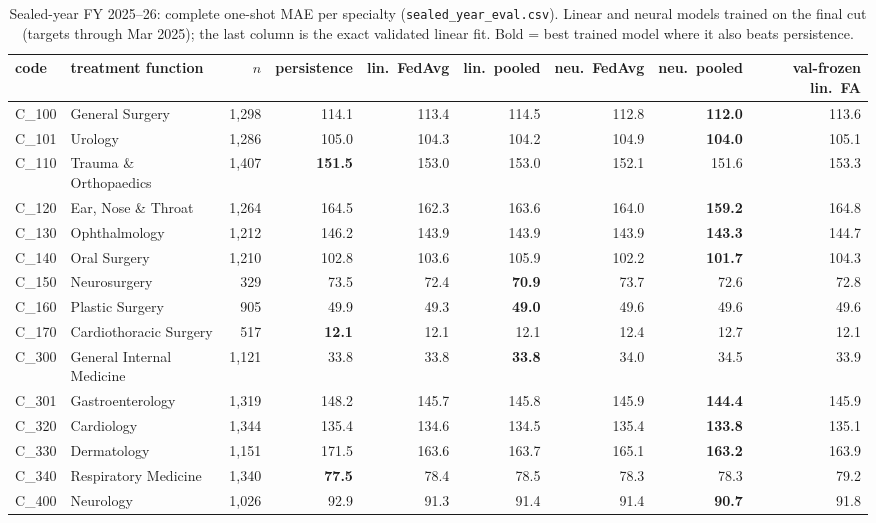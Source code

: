 \documentclass[conference]{IEEEtran}
\begin{document}
\begin{table}[t]
\caption{Sealed-year FY 2025--26: complete one-shot MAE per specialty
(\texttt{sealed\_year\_eval.csv}). Linear and neural models trained on the final cut (targets
through Mar 2025); the last column is the exact validated linear fit. Bold = best trained model
where it also beats persistence.}
\label{tab:sealedfull}
\centering
\scriptsize
\setlength{\tabcolsep}{3.5pt}
\begin{tabular}{llrrrrrrr}
\toprule
code & treatment function & $n$ & persistence & lin.\ FedAvg & lin.\ pooled & neu.\ FedAvg & neu.\ pooled & val-frozen lin.\ FA \\
\midrule
C\_100 & General Surgery & 1{,}298 & 114.1 & 113.4 & 114.5 & 112.8 & \textbf{112.0} & 113.6 \\
C\_101 & Urology & 1{,}286 & 105.0 & 104.3 & 104.2 & 104.9 & \textbf{104.0} & 105.1 \\
C\_110 & Trauma \& Orthopaedics & 1{,}407 & \textbf{151.5} & 153.0 & 153.0 & 152.1 & 151.6 & 153.3 \\
C\_120 & Ear, Nose \& Throat & 1{,}264 & 164.5 & 162.3 & 163.6 & 164.0 & \textbf{159.2} & 164.8 \\
C\_130 & Ophthalmology & 1{,}212 & 146.2 & 143.9 & 143.9 & 143.9 & \textbf{143.3} & 144.7 \\
C\_140 & Oral Surgery & 1{,}210 & 102.8 & 103.6 & 105.9 & 102.2 & \textbf{101.7} & 104.3 \\
C\_150 & Neurosurgery & 329 & 73.5 & 72.4 & \textbf{70.9} & 73.7 & 72.6 & 72.8 \\
C\_160 & Plastic Surgery & 905 & 49.9 & 49.3 & \textbf{49.0} & 49.6 & 49.6 & 49.6 \\
C\_170 & Cardiothoracic Surgery & 517 & \textbf{12.1} & 12.1 & 12.1 & 12.4 & 12.7 & 12.1 \\
C\_300 & General Internal Medicine & 1{,}121 & 33.8 & 33.8 & \textbf{33.8} & 34.0 & 34.5 & 33.9 \\
C\_301 & Gastroenterology & 1{,}319 & 148.2 & 145.7 & 145.8 & 145.9 & \textbf{144.4} & 145.9 \\
C\_320 & Cardiology & 1{,}344 & 135.4 & 134.6 & 134.5 & 135.4 & \textbf{133.8} & 135.1 \\
C\_330 & Dermatology & 1{,}151 & 171.5 & 163.6 & 163.7 & 165.1 & \textbf{163.2} & 163.9 \\
C\_340 & Respiratory Medicine & 1{,}340 & \textbf{77.5} & 78.4 & 78.5 & 78.3 & 78.3 & 79.2 \\
C\_400 & Neurology & 1{,}026 & 92.9 & 91.3 & 91.4 & 91.4 & \textbf{90.7} & 91.8 \\

\end{tabular}
\end{table}
\end{document}

